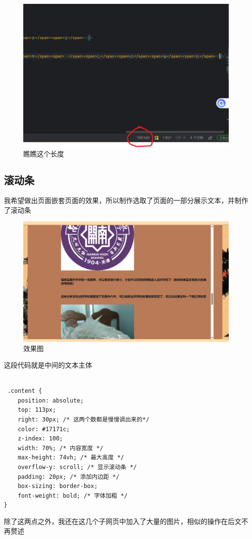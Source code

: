 \documentclass[supercite]{Experimental_Report}
\theoremstyle{definition}
\begin{document}
\begin{figure}[htb]
	\begin{center}
		\includegraphics[scale=0.40]{images/3-3.png}
		\caption{瞧瞧这个长度}
		\label{fig3-3}
	\end{center}
\end{figure}
\subsection{滚动条}
我希望做出页面嵌套页面的效果，所以制作选取了页面的一部分展示文本，并制作了滚动条
\begin{figure}[htb]
	\begin{center}
		\includegraphics[scale=0.40]{images/3-4.png}
		\caption{效果图}
		\label{fig3-4}
	\end{center}
\end{figure}
这段代码就是中间的文本主体
\begin{verbatim}
	
 .content {
	position: absolute;
	top: 113px; 
	right: 30px; /* 这两个数都是慢慢调出来的*/
	color: #17171c;
	z-index: 100;
	width: 70%; /* 内容宽度 */
	max-height: 74vh; /* 最大高度 */
	overflow-y: scroll; /* 显示滚动条 */
	padding: 20px; /* 添加内边距 */
	box-sizing: border-box; 
	font-weight: bold; /* 字体加粗 */
}
\end{verbatim}
除了这两点之外，我还在这几个子网页中加入了大量的图片，相似的操作在后文不再赘述
\newpage
\end{document}
